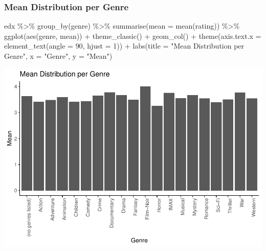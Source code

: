 \documentclass[
]{article}
\newenvironment{Shaded}{}{}
\newcommand{\AttributeTok}[1]{\textcolor[rgb]{0.49,0.56,0.16}{#1}}
\newcommand{\DecValTok}[1]{\textcolor[rgb]{0.25,0.63,0.44}{#1}}
\newcommand{\FunctionTok}[1]{\textcolor[rgb]{0.02,0.16,0.49}{#1}}
\newcommand{\NormalTok}[1]{#1}
\newcommand{\SpecialCharTok}[1]{\textcolor[rgb]{0.25,0.44,0.63}{#1}}
\newcommand{\StringTok}[1]{\textcolor[rgb]{0.25,0.44,0.63}{#1}}
\begin{document}
\hypertarget{mean-distribution-per-genre}{%
\subsubsection{Mean Distribution per
Genre}\label{mean-distribution-per-genre}}

\begin{Shaded}
\begin{Highlighting}[]
\NormalTok{edx }\SpecialCharTok{\%\textgreater{}\%}
   \FunctionTok{group\_by}\NormalTok{(genre) }\SpecialCharTok{\%\textgreater{}\%}
   \FunctionTok{summarise}\NormalTok{(}\AttributeTok{mean =} \FunctionTok{mean}\NormalTok{(rating)) }\SpecialCharTok{\%\textgreater{}\%}
   \FunctionTok{ggplot}\NormalTok{(}\FunctionTok{aes}\NormalTok{(genre, mean)) }\SpecialCharTok{+}
   \FunctionTok{theme\_classic}\NormalTok{()  }\SpecialCharTok{+}
   \FunctionTok{geom\_col}\NormalTok{() }\SpecialCharTok{+}
   \FunctionTok{theme}\NormalTok{(}\AttributeTok{axis.text.x =} \FunctionTok{element\_text}\NormalTok{(}\AttributeTok{angle =} \DecValTok{90}\NormalTok{, }\AttributeTok{hjust =} \DecValTok{1}\NormalTok{)) }\SpecialCharTok{+}
   \FunctionTok{labs}\NormalTok{(}\AttributeTok{title =} \StringTok{"Mean Distribution per Genre"}\NormalTok{,}
        \AttributeTok{x =} \StringTok{"Genre"}\NormalTok{,}
        \AttributeTok{y =} \StringTok{"Mean"}\NormalTok{)}
\end{Highlighting}
\end{Shaded}

\begin{center}\includegraphics{MovieLens-Project-Code_files/figure-latex/unnamed-chunk-31-1} \end{center}
\end{document}
